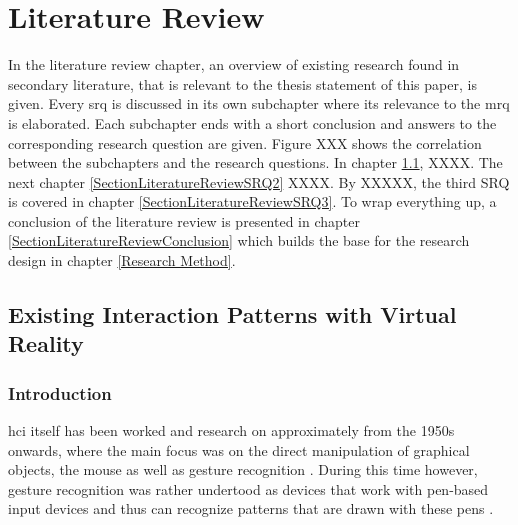 
\chapter{Literature Review} %

\label{ChapterLiteratureReview} %

In the literature review chapter, an overview of existing research found in secondary literature, that is relevant to the thesis statement of this paper, is given. Every \gls{srq} is discussed in its own subchapter where its relevance to the \gls{mrq} is elaborated. Each subchapter ends with a short conclusion and answers to the corresponding research question are given.
Figure XXX shows the correlation between the subchapters and the research questions. In chapter \ref{SectionLiteratureReviewSRQ1}, XXXX. The next chapter \ref{SectionLiteratureReviewSRQ2} XXXX. By XXXXX, the third SRQ is covered in chapter \ref{SectionLiteratureReviewSRQ3}. To wrap everything up, a conclusion of the literature review is presented in chapter \ref{SectionLiteratureReviewConclusion} which builds the base for the research design in chapter \ref{Research Method}.




\section{Existing Interaction Patterns with Virtual Reality}

\label{SectionLiteratureReviewSRQ1}

\subsection{Introduction}

\gls{hci} itself has been worked and research on approximately from the 1950s onwards, where the main focus was on the direct manipulation of graphical objects, the mouse as well as gesture recognition \citep{Myers1998}. During this time however, gesture recognition was rather undertood as devices that work with pen-based input devices and thus can recognize patterns that are drawn with these pens \citep{Myers1998}.


